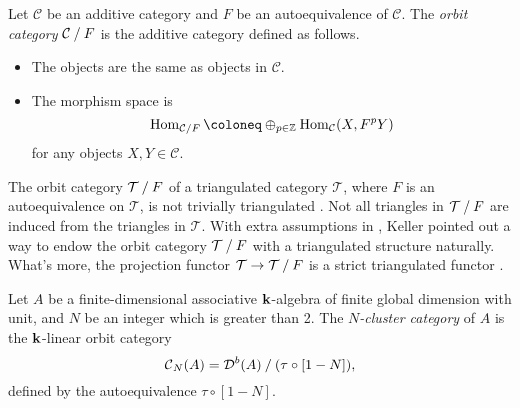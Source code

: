 \begin{definition}
  Let $\mathcal{C}$ be an additive category
  and $F$ be an autoequivalence of $\mathcal{C}$.
  The \textit{orbit category} $\mathcal{C} \mathbin{/} F$
  is the additive category defined as follows.
  \begin{itemize}
    \item The objects are the same as objects in $\mathcal{C}$.
    \item The morphism space is
      \[
        \Hom_{\mathcal{C} \quot F} \coloneq
        \oplus_{p \in \ZZ} \Hom_{\mathcal{C}}(X, F^pY)
      \]
      for any objects $X, Y\in \mathcal{C}$.
  \end{itemize}
\end{definition}

\begin{remark}
  The orbit category $\mathcal{T} \mathbin{/} F$ of a triangulated category $\mathcal{T}$,
  where $F$ is an autoequivalence on $\mathcal{T}$,
  is not trivially triangulated \cite{K3}.
  Not all triangles in $\mathcal{T} \mathbin{/} F$
  are induced from the triangles in $\mathcal{T}$.
  With extra assumptions in \cite[Theorem 1]{K3},
  Keller pointed out a way to endow the orbit category $\mathcal{T} \mathbin{/} F$
  with a triangulated structure naturally.
  What's more, the projection functor $\mathcal{T} \to \mathcal{T} \mathbin{/} F$
  is a strict triangulated functor \cite{K3}.
\end{remark}

\begin{definition}
  Let $A$ be a finite-dimensional associative $\mathbf{k}$-algebra
  of finite global dimension with unit,
  and $N$ be an integer which is greater than 2.
  The \textit{$N$-cluster category} of $A$ is the $\mathbf{k}$-linear orbit category
  \[ \operatorname{\mathcal{C}}_N(A) = \operatorname{\mathcal{D}}^b(A) \mathbin{/} (\tau \circ [1-N]), \]
  defined by the autoequivalence $\tau \circ [1-N]$.
\end{definition}

